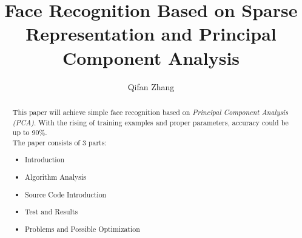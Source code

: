 \documentclass[sigconf]{acmart}
\begin{document}
\title{Face Recognition Based on Sparse Representation and Principal Component Analysis}

\author{Qifan Zhang} 




\begin{abstract}
This paper will achieve simple face recognition based on \emph{Principal Component Analysis (PCA)}. With the rising of training examples and proper parameters, accuracy could be up to 90\(\%\).
\\
The paper consists of 3 parts:
\begin{itemize}
	\item Introduction
	\item Algorithm Analysis
	\item Source Code Introduction
	\item Test and Results
	\item Problems and Possible Optimization
\end{itemize}
\end{abstract}

%
%




\maketitle




% 
\end{document}
